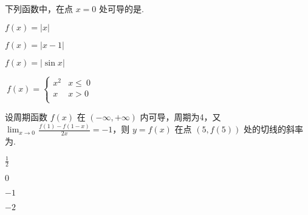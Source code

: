 \begin{problem}下列函数中，在点 $x = 0$ 处可导的是.

\begin{abcd} \item $f\left( x \right) = |x|$

\item $f\left( x \right) = |x - 1|$

\item $f\left( x \right) = |\sin x|$

\item
$\ f(x) = \left\{ \begin{matrix} x^{2} & x \leq \ 0 \\ x & x > 0 \\ \end{matrix} \right.\ $

\end{abcd}

\end{problem}           

\begin{problem}设周期函数 $f\left( x \right)$ 在 $( - \infty, + \infty)$
内可导，周期为4，又
$\displaystyle \lim_{x \rightarrow 0}\mspace{2mu}\frac{f(1) - f(1 - x)}{2x} = - 1$，则
$y = f\left( x \right)$ 在点 $(5,f(5))$ 处的切线的斜率为.

\begin{abcd} 
	\item $\displaystyle \frac{1}{2}$ \item $0$ \item $- 1$ \item $- 2$

\end{abcd}


\end{problem}           


